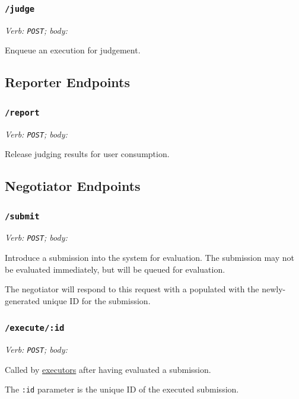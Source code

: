 \documentclass[11pt,letterpaper]{article}
\begin{document}
\subsubsection{\texttt{/judge}}

\emph{Verb: \texttt{POST}; body: }

Enqueue an execution for judgement.

\subsection{Reporter Endpoints}
\label{endpoints-report}

\subsubsection{\texttt{/report}}

\emph{Verb: \texttt{POST}; body: }

Release judging results for user consumption.

\subsection{Negotiator Endpoints}
\label{endpoints-hub}

\subsubsection{\texttt{/submit}}

\emph{Verb: \texttt{POST}; body: }

Introduce a submission into the system for evaluation. The submission may not
be evaluated immediately, but will be queued for evaluation.

The negotiator will respond to this request with a 
populated with the newly-generated unique ID for the submission.

\subsubsection{\texttt{/execute/:id}}

\emph{Verb: \texttt{POST}; body: }

Called by \hyperref[design-executor-judge]{executors} after having evaluated a
submission.

The \texttt{:id} parameter is the unique ID of the executed submission.
\end{document}
